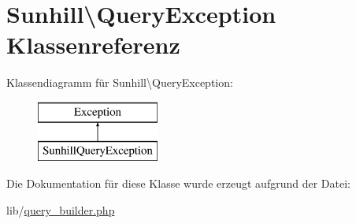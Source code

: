 \hypertarget{classSunhill_1_1QueryException}{}\section{Sunhill\textbackslash{}Query\+Exception Klassenreferenz}
\label{classSunhill_1_1QueryException}
Klassendiagramm für Sunhill\textbackslash{}Query\+Exception\+:\begin{figure}[H]
\begin{center}
\leavevmode
\includegraphics[height=2.000000cm]{d1/d14/classSunhill_1_1QueryException}
\end{center}
\end{figure}


Die Dokumentation für diese Klasse wurde erzeugt aufgrund der Datei\+:\begin{DoxyCompactItemize}
\item 
lib/\hyperlink{query__builder_8php}{query\+\_\+builder.\+php}\end{DoxyCompactItemize}
